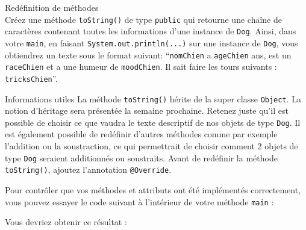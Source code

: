\begin{Exercice}[5 minutes] Redéfinition de méthodes\\
    Créez une méthode \lstinline{toString()} de type \lstinline{public} qui retourne une chaîne de caractères contenant toutes les informations d'une instance de \lstinline{Dog}. Ainsi, dans votre \lstinline{main}, en faisant \lstinline{System.out.println(...)} sur une instance de \lstinline{Dog}, vous obtiendrez un texte sous le format suivant: 
    ``\lstinline{nomChien} a \lstinline{ageChien} ans, est un \lstinline{raceChien} et a une humeur de \lstinline{moodChien}. Il sait faire les tours suivants : \lstinline{tricksChien}''.

    \begin{Example}{\faLightbulb \quad Informations utiles}
        La méthode \lstinline{toString()} hérite de la super classe \lstinline{Object}. La notion d'héritage sera présentée la semaine prochaine. Retenez juste qu'il est possible de choisir ce que vaudra le texte descriptif de nos objets de type \lstinline{Dog}. Il est également possible de redéfinir d'autres méthodes comme par exemple l'addition ou la soustraction, ce qui permettrait de choisir comment 2 objets de type \lstinline{Dog} seraient additionnés ou soustraits.
        Avant de redéfinir la méthode \lstinline{toString()}, ajoutez l'annotation \lstinline{@Override}.
        \\
    \end{Example}

    \begin{solution}
        
    \end{solution}
\end{Exercice}

Pour contrôler que vos méthodes et attributs ont été implémentés correctement, vous pouvez essayer le code suivant à l'intérieur de votre méthode \lstinline{main} :

	
	
Vous devriez obtenir ce résultat :
    

\newpage
